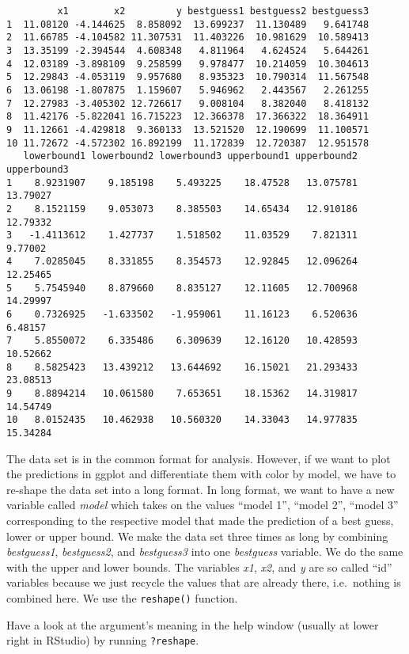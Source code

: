 \documentclass[]{article}
\begin{document}
\begin{verbatim}
         x1        x2         y bestguess1 bestguess2 bestguess3
1  11.08120 -4.144625  8.858092  13.699237  11.130489   9.641748
2  11.66785 -4.104582 11.307531  11.403226  10.981629  10.589413
3  13.35199 -2.394544  4.608348   4.811964   4.624524   5.644261
4  12.03189 -3.898109  9.258599   9.978477  10.214059  10.304613
5  12.29843 -4.053119  9.957680   8.935323  10.790314  11.567548
6  13.06198 -1.807875  1.159607   5.946962   2.443567   2.261255
7  12.27983 -3.405302 12.726617   9.008104   8.382040   8.418132
8  11.42176 -5.822041 16.715223  12.366378  17.366322  18.364911
9  11.12661 -4.429818  9.360133  13.521520  12.190699  11.100571
10 11.72672 -4.572302 16.892199  11.172839  12.720387  12.951578
   lowerbound1 lowerbound2 lowerbound3 upperbound1 upperbound2 upperbound3
1    8.9231907    9.185198    5.493225    18.47528   13.075781    13.79027
2    8.1521159    9.053073    8.385503    14.65434   12.910186    12.79332
3   -1.4113612    1.427737    1.518502    11.03529    7.821311     9.77002
4    7.0285045    8.331855    8.354573    12.92845   12.096264    12.25465
5    5.7545940    8.879660    8.835127    12.11605   12.700968    14.29997
6    0.7326925   -1.633502   -1.959061    11.16123    6.520636     6.48157
7    5.8550072    6.335486    6.309639    12.16120   10.428593    10.52662
8    8.5825423   13.439212   13.644692    16.15021   21.293433    23.08513
9    8.8894214   10.061580    7.653651    18.15362   14.319817    14.54749
10   8.0152435   10.462938   10.560320    14.33043   14.977835    15.34284
\end{verbatim}

The data set is in the common format for analysis. However, if we want to plot the predictions in ggplot and differentiate them with color by model, we have to re-shape the data set into a long format. In long format, we want to have a new variable called \emph{model} which takes on the values ``model 1'', ``model 2'', ``model 3'' corresponding to the respective model that made the prediction of a best guess, lower or upper bound. We make the data set three times as long by combining \emph{bestguess1}, \emph{bestguess2}, and \emph{bestguess3} into one \emph{bestguess} variable. We do the same with the upper and lower bounds. The variables \emph{x1}, \emph{x2}, and \emph{y} are so called ``id'' variables because we just recycle the values that are already there, i.e.~nothing is combined here. We use the \texttt{reshape()} function.

Have a look at the argument's meaning in the help window (usually at lower right in RStudio) by running \texttt{?reshape}.
\end{document}
